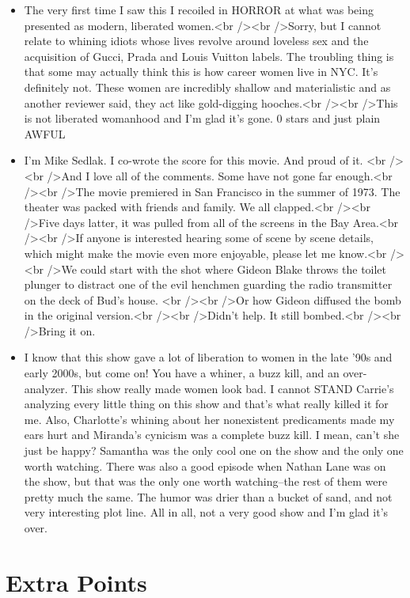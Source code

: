 \documentclass[10pt,a4paper]{article}
\begin{document}
\begin{itemize}
\item The very first time I saw this I recoiled in HORROR at what was being presented as modern, liberated women.<br /><br />Sorry, but I cannot relate to whining idiots whose lives revolve around loveless sex and the acquisition of Gucci, Prada and Louis Vuitton labels. The troubling thing is that some may actually think this is how career women live in NYC. It's definitely not. These women are incredibly shallow and materialistic and as another reviewer said, they act like gold-digging hooches.<br /><br />This is not liberated womanhood and I'm glad it's gone. 0 stars and just plain AWFUL
\item I'm Mike Sedlak. I co-wrote the score for this movie. And proud of it. <br /><br />And I love all of the comments. Some have not gone far enough.<br /><br />The movie premiered in San Francisco in the summer of 1973. The theater was packed with friends and family. We all clapped.<br /><br />Five days latter, it was pulled from all of the screens in the Bay Area.<br /><br />If anyone is interested hearing some of scene by scene details, which might make the movie even more enjoyable, please let me know.<br /><br />We could start with the shot where Gideon Blake throws the toilet plunger to distract one of the evil henchmen guarding the radio transmitter on the deck of Bud's house. <br /><br />Or how Gideon diffused the bomb in the original version.<br /><br />Didn't help. It still bombed.<br /><br />Bring it on.
\item I know that this show gave a lot of liberation to women in the late '90s and early 2000s, but come on! You have a whiner, a buzz kill, and an over-analyzer. This show really made women look bad. I cannot STAND Carrie's analyzing every little thing on this show and that's what really killed it for me. Also, Charlotte's whining about her nonexistent predicaments made my ears hurt and Miranda's cynicism was a complete buzz kill. I mean, can't she just be happy? Samantha was the only cool one on the show and the only one worth watching. There was also a good episode when Nathan Lane was on the show, but that was the only one worth watching--the rest of them were pretty much the same. The humor was drier than a bucket of sand, and not very interesting plot line. All in all, not a very good show and I'm glad it's over.	
\end{itemize}

\section{Extra Points}
\end{document}
